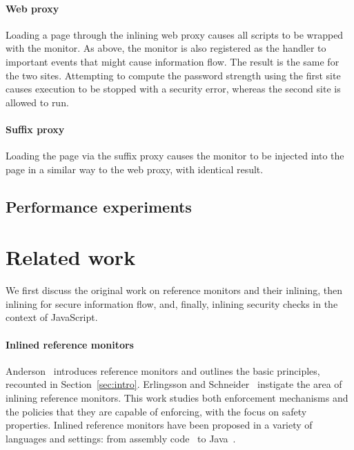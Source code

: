 \documentclass{llncs}
\begin{document}
\paragraph{Web proxy}

Loading a page through the inlining web proxy causes all scripts to be wrapped
with the monitor. As above, the monitor is also registered as the handler to
important events that might cause information flow. The result is the same
for the two sites. Attempting to compute the password strength using the first
site causes execution to be stopped with a security error, whereas the second
site is allowed to run.

\paragraph{Suffix proxy}

Loading the page via the suffix proxy causes the monitor to be injected into the page in 
a similar way to the web proxy, with identical result.

\subsection{Performance experiments}

\section{Related work}
\label{sec:related}
We first discuss the original work on reference monitors and their
inlining, then
inlining for secure information flow, 
and, finally,
inlining security checks in the context of
JavaScript.

\paragraph{Inlined reference monitors}
Anderson~\cite{Anderson:72} introduces reference monitors and
outlines the basic principles, recounted in Section~\ref{sec:intro}.
%
Erlingsson and Schneider~\cite{DBLP:conf/nspw/ErlingssonS99,Erlingsson:PhD04} instigate
the area of inlining reference monitors. 
This work studies both enforcement mechanisms and the policies
that they are capable of enforcing, with the focus on safety properties.
Inlined reference monitors
have been proposed in a variety of languages and settings: from
assembly code~\cite{DBLP:conf/nspw/ErlingssonS99} to Java~\cite{DBLP:conf/ecoop/DamJLP09,DBLP:journals/jcs/DamJLP10,DBLP:conf/ccs/DamGL12}.
\end{document}
